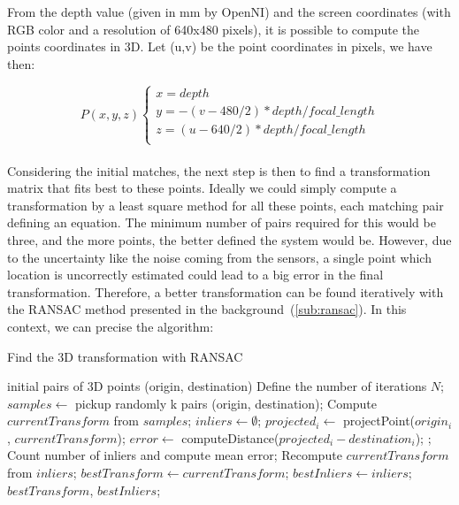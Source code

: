 From the depth value (given in mm by OpenNI) and the screen coordinates (with RGB color and a resolution of 640x480 pixels), it is possible to compute the points coordinates in 3D. Let (u,v) be the point coordinates in pixels, we have then:

\[
P(x,y,z)\left\{
\begin{array}{l}
x = depth \\
y = -(v - 480/2) * depth / focal\_length \\
z = (u - 640/2) * depth / focal\_length \\
\end{array}
\right.
\]

\paragraph{}
Considering the initial matches, the next step is then to find a transformation matrix that fits best to these points. Ideally we could simply compute a transformation by a least square method for all these points, each matching pair defining an equation. The minimum number of pairs required for this would be three, and the more points, the better defined the system would be. However, due to the uncertainty like the noise coming from the sensors, a single point which location is uncorrectly estimated could lead to a big error in the final transformation. Therefore, a better transformation can be found iteratively with the \gls{RANSAC} method presented in the background~(\ref{sub:ransac}). In this context, we can precise the algorithm:

\begin{algorithm}[H]
\caption{Find the 3D transformation with RANSAC}
\begin{algorithmic}
\REQUIRE initial pairs of 3D points (origin, destination)
\STATE Define the number of iterations $N$;
 \STATE $samples \gets$ pickup randomly k pairs (origin, destination);
 \STATE Compute $currentTransform$ from $samples$;
 \STATE $inliers \gets \emptyset$;
  \STATE $projected_i \gets$ projectPoint($origin_i$, $currentTransform$);
  \STATE $error \gets$ computeDistance($projected_i - destination_i$);
   ;
  \ENDIF
 \ENDFOR
 \STATE Count number of inliers and compute mean error;
  \STATE Recompute $currentTransform$ from $inliers$;
   \STATE $bestTransform \gets currentTransform$;
   \STATE $bestInliers \gets inliers$;
  \ENDIF
 \ENDIF
\ENDFOR
\RETURN $bestTransform$, $bestInliers$;
\end{algorithmic}
\end{algorithm}

